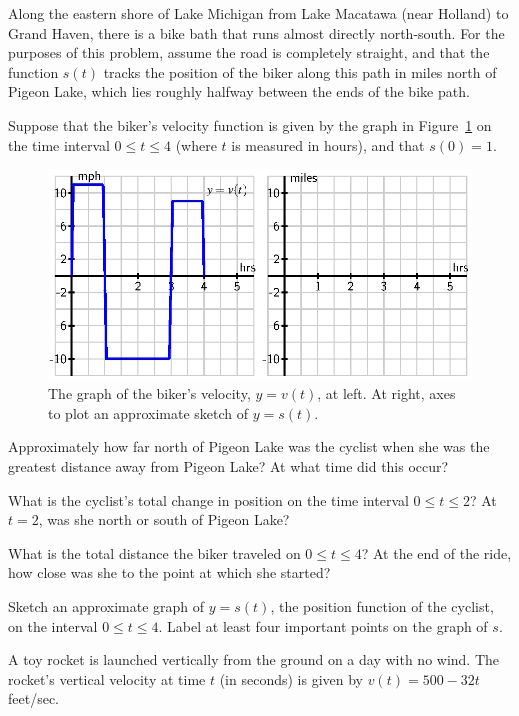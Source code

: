 \begin{exercises} 
  \item Along the eastern shore of Lake Michigan from Lake Macatawa (near Holland) to Grand Haven, there is a bike bath that runs almost directly north-south.  For the purposes of this problem, assume the road is completely straight, and that the function $s(t)$ tracks the position of the biker along this path in miles north of Pigeon Lake, which lies roughly halfway between the ends of the bike path.  
  
Suppose that the biker's velocity function is given by the graph in Figure~\ref{F:4.1.Ez1} on the time interval $0 \le t \le 4$ (where $t$ is measured in hours), and that $s(0) = 1$.
\begin{figure}[h]
\begin{center}
\includegraphics{figures/4_1_Ez1.eps}
\caption{The graph of the biker's velocity, $y = v(t)$, at left.  At right, axes to plot an approximate sketch of $y = s(t)$.} \label{F:4.1.Ez1}
\end{center}
\end{figure}
\ba
	\item Approximately how far north of Pigeon Lake was the cyclist when she was the greatest distance away from Pigeon Lake?  At what time did this occur?
	\item What is the cyclist's total change in position on the time interval $0 \le t \le 2$?  At $t = 2$, was she north or south of Pigeon Lake?
	\item What is the total distance the biker traveled on $0 \le t \le 4$?  At the end of the ride, how close was she to the point at which she started?
	\item Sketch an approximate graph of $y = s(t)$, the position function of the cyclist, on the interval $0 \le t \le 4$.  Label at least four important points on the graph of $s$.
\ea
  \item A toy rocket is launched vertically from the ground on a day with no wind.  The rocket's vertical velocity at time $t$ (in seconds) is given by $v(t)= 500-32t$ feet/sec.

\end{exercises}
